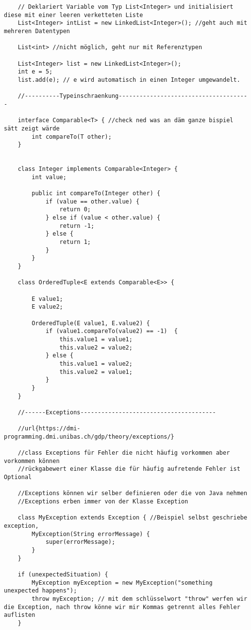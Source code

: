 \documentclass[a4paper,12pt]{article}
\begin{document}
\begin{lstlisting}
    // Deklariert Variable vom Typ List<Integer> und initialisiert diese mit einer leeren verketteten Liste
    List<Integer> intList = new LinkedList<Integer>(); //geht auch mit mehreren Datentypen

    List<int> //nicht möglich, geht nur mit Referenztypen

    List<Integer> list = new LinkedList<Integer>();
    int e = 5; 
    list.add(e); // e wird automatisch in einen Integer umgewandelt.

    //----------Typeinschraenkung--------------------------------------

    interface Comparable<T> { //check ned was an däm ganze bispiel sätt zeigt wärde
        int compareTo(T other);
    }


    class Integer implements Comparable<Integer> { 
        int value; 

        public int compareTo(Integer other) {
            if (value == other.value) { 
                return 0;
            } else if (value < other.value) {
                return -1;
            } else {
                return 1;
            }
        }
    }

    class OrderedTuple<E extends Comparable<E>> { 

        E value1;
        E value2;
        
        OrderedTuple(E value1, E.value2) {
            if (value1.compareTo(value2) == -1)  {
                this.value1 = value1;
                this.value2 = value2;
            } else {
                this.value1 = value2;
                this.value2 = value1;
            }
        }
    }

    //------Exceptions---------------------------------------

    //url{https://dmi-programming.dmi.unibas.ch/gdp/theory/exceptions/}

    //class Exceptions für Fehler die nicht häufig vorkommen aber vorkommen können
    //rückgabewert einer Klasse die für häufig aufretende Fehler ist Optional

    //Exceptions können wir selber definieren oder die von Java nehmen
    //Exceptions erben immer von der Klasse Exception

    class MyException extends Exception { //Beispiel selbst geschriebe exception, 
        MyException(String errorMessage) {
            super(errorMessage);
        }
    }

    if (unexpectedSituation) {
        MyException myException = new MyException("something unexpected happens");
        throw myException; // mit dem schlüsselwort "throw" werfen wir die Exception, nach throw könne wir mir Kommas getrennt alles Fehler auflisten
    }


\end{lstlisting}
\end{document}
